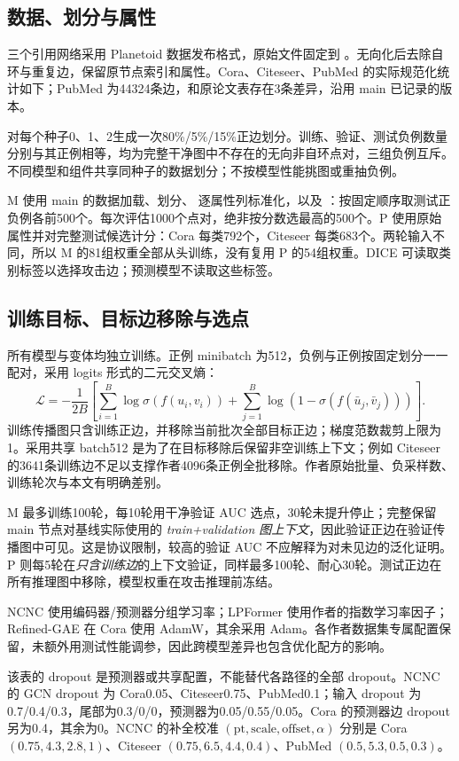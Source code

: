 \subsection{数据、划分与属性}
三个引用网络采用 Planetoid 数据发布格式\cite{yang2016planetoid}，原始文件固定到 。无向化后去除自环与重复边，保留原节点索引和属性。Cora、Citeseer、PubMed 的实际规范化统计如下；PubMed 为44324条边，和原论文表存在3条差异，沿用 main 已记录的版本。

对每个种子0、1、2生成一次80\%/5\%/15\%正边划分。训练、验证、测试负例数量分别与其正例相等，均为完整干净图中不存在的无向非自环点对，三组负例互斥。不同模型和组件共享同种子的数据划分；不按模型性能挑图或重抽负例。

M 使用 main 的数据加载、划分、 逐属性列标准化，以及 ：按固定顺序取测试正负例各前500个。每次评估1000个点对，绝非按分数选最高的500个。P 使用原始属性并对完整测试候选计分：Cora 每类792个，Citeseer 每类683个。两轮输入不同，所以 M 的81组权重全部从头训练，没有复用 P 的54组权重。DICE 可读取类别标签以选择攻击边；预测模型不读取这些标签。

\subsection{训练目标、目标边移除与选点}
所有模型与变体均独立训练。正例 minibatch 为512，负例与正例按固定划分一一配对，采用 logits 形式的二元交叉熵：
\begin{equation}
 \mathcal L=-\frac1{2B}\left[\sum_{i=1}^B\log\sigma(f(u_i,v_i))+\sum_{j=1}^B\log(1-\sigma(f(\bar u_j,\bar v_j)))\right].
\end{equation}
训练传播图只含训练正边，并移除当前批次全部目标正边；梯度范数裁剪上限为1。采用共享 batch512 是为了在目标移除后保留非空训练上下文；例如 Citeseer 的3641条训练边不足以支撑作者4096条正例全批移除。作者原始批量、负采样数、训练轮次与本文有明确差别。

M 最多训练100轮，每10轮用干净验证 AUC 选点，30轮未提升停止；完整保留 main 节点对基线实际使用的 \emph{train+validation 图上下文}，因此验证正边在验证传播图中可见。这是协议限制，较高的验证 AUC 不应解释为对未见边的泛化证明。P 则每5轮在\emph{只含训练边}的上下文验证，同样最多100轮、耐心30轮。测试正边在所有推理图中移除，模型权重在攻击推理前冻结。

NCNC 使用编码器/预测器分组学习率；LPFormer 使用作者的指数学习率因子；Refined-GAE 在 Cora 使用 AdamW，其余采用 Adam。各作者数据集专属配置保留，未额外用测试性能调参，因此跨模型差异也包含优化配方的影响。

该表的 dropout 是预测器或共享配置，不能替代各路径的全部 dropout。NCNC 的 GCN dropout 为 Cora0.05、Citeseer0.75、PubMed0.1；输入 dropout 为0.7/0.4/0.3，尾部为0.3/0/0，预测器为0.05/0.55/0.05。Cora 的预测器边 dropout 另为0.4，其余为0。NCNC 的补全校准 $(\mathrm{pt},\mathrm{scale},\mathrm{offset},\alpha)$ 分别是 Cora $(0.75,4.3,2.8,1)$、Citeseer $(0.75,6.5,4.4,0.4)$、PubMed $(0.5,5.3,0.5,0.3)$。


